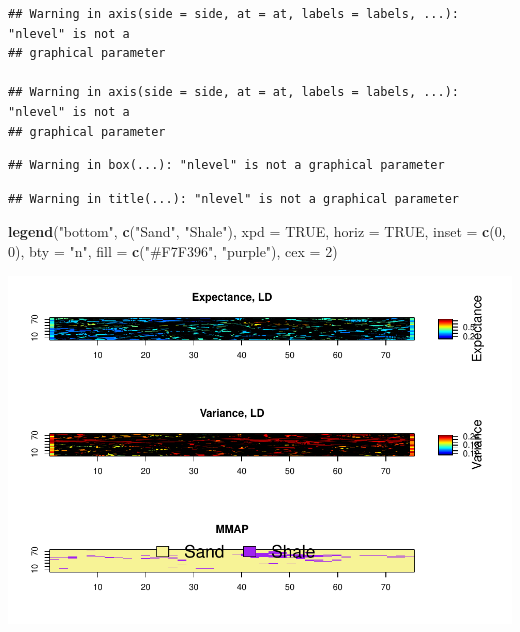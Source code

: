 \documentclass[
]{article}
\newenvironment{Shaded}{\begin{snugshade}}{\end{snugshade}}
\newcommand{\DataTypeTok}[1]{\textcolor[rgb]{0.13,0.29,0.53}{#1}}
\newcommand{\DecValTok}[1]{\textcolor[rgb]{0.00,0.00,0.81}{#1}}
\newcommand{\KeywordTok}[1]{\textcolor[rgb]{0.13,0.29,0.53}{\textbf{#1}}}
\newcommand{\NormalTok}[1]{#1}
\newcommand{\OtherTok}[1]{\textcolor[rgb]{0.56,0.35,0.01}{#1}}
\newcommand{\StringTok}[1]{\textcolor[rgb]{0.31,0.60,0.02}{#1}}
\begin{document}
\begin{verbatim}
## Warning in axis(side = side, at = at, labels = labels, ...): "nlevel" is not a
## graphical parameter

## Warning in axis(side = side, at = at, labels = labels, ...): "nlevel" is not a
## graphical parameter
\end{verbatim}

\begin{verbatim}
## Warning in box(...): "nlevel" is not a graphical parameter
\end{verbatim}

\begin{verbatim}
## Warning in title(...): "nlevel" is not a graphical parameter
\end{verbatim}

\begin{Shaded}
\begin{Highlighting}[]
\KeywordTok{legend}\NormalTok{(}\StringTok{"bottom"}\NormalTok{, }\KeywordTok{c}\NormalTok{(}\StringTok{"Sand"}\NormalTok{, }\StringTok{"Shale"}\NormalTok{), }\DataTypeTok{xpd =} \OtherTok{TRUE}\NormalTok{, }\DataTypeTok{horiz =} \OtherTok{TRUE}\NormalTok{, }\DataTypeTok{inset =} \KeywordTok{c}\NormalTok{(}\DecValTok{0}\NormalTok{, }
    \DecValTok{0}\NormalTok{), }\DataTypeTok{bty =} \StringTok{"n"}\NormalTok{, }\DataTypeTok{fill =} \KeywordTok{c}\NormalTok{(}\StringTok{"#F7F396"}\NormalTok{, }\StringTok{"purple"}\NormalTok{), }\DataTypeTok{cex =} \DecValTok{2}\NormalTok{)}
\end{Highlighting}
\end{Shaded}

\includegraphics{Ex3_files/figure-latex/unnamed-chunk-6-1.pdf}
\end{document}
